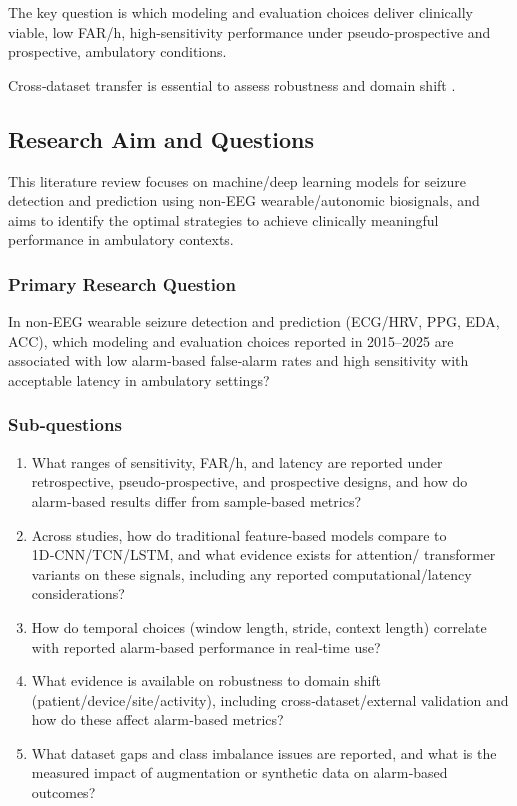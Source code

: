 The key question is which modeling and evaluation choices deliver
clinically viable, low FAR/h, high-sensitivity performance under
pseudo-prospective and prospective, ambulatory conditions.

Cross‑dataset transfer is essential to assess robustness and domain
shift \parencite{yangMultimodalAISystem2022,andradePerformanceSeizurePrediction2024}.

\subsection{Research Aim and Questions}
This literature review focuses on machine/deep learning models for seizure detection and prediction
using non-EEG wearable/autonomic biosignals, and aims to identify the optimal strategies to achieve clinically
meaningful performance in ambulatory contexts.

\vspace{0.5em}

\subsubsection{Primary Research Question}
In non‑EEG wearable seizure detection and prediction
(ECG/HRV, PPG, EDA, ACC), which modeling and evaluation choices
reported in 2015--2025 are associated with low alarm‑based false‑alarm
rates and high sensitivity with acceptable latency in ambulatory
settings?

\subsubsection{Sub‑questions}
\begin{enumerate}
  \item What ranges of sensitivity, FAR/h, and latency are reported
    under retrospective, pseudo‑prospective, and prospective designs,
    and how do alarm‑based results differ from sample‑based metrics?
  \item Across studies, how do traditional feature‑based models compare
    to 1D‑CNN/TCN/LSTM, and what evidence exists for attention/
    transformer variants on these signals, including any reported
    computational/latency considerations?
  \item How do temporal choices (window length, stride, context length)
    correlate with reported alarm‑based performance in real‑time use?
  \item What evidence is available on robustness to domain shift
    (patient/device/site/activity), including cross‑dataset/external
    validation and how do these affect alarm‑based metrics?
  \item What dataset gaps and class imbalance issues are reported, and
    what is the measured impact of augmentation or synthetic data on
    alarm‑based outcomes?
\end{enumerate}

